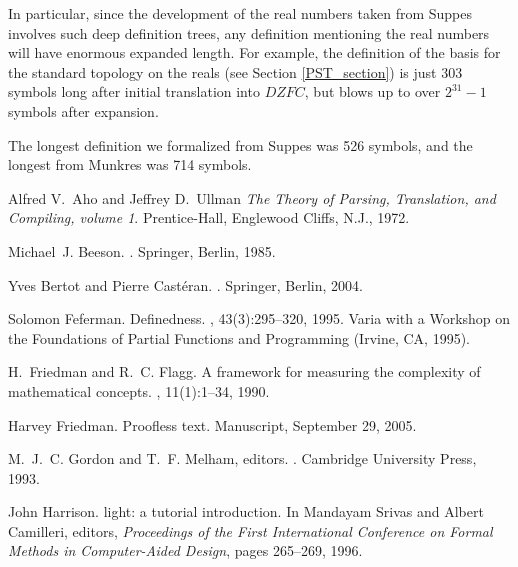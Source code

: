 \documentclass{llncs}
\newcommand{\na}[1]{\mathit{#1}}    \newcommand{\fn}[1]{\mathit{#1}}    \newcommand{\ax}[1]{\mathit{(#1)}}  \newcommand{\mdl}[1]{\mathcal{#1}}
\begin{document}
In particular, since the development of the real numbers taken from
Suppes \cite{suppes} involves such deep definition trees, any
definition mentioning the real numbers will have enormous expanded
length. For example, the definition of the basis for the standard
topology on the reals (see Section \ref{PST_section}) is just 303
symbols long after initial translation into $\na{DZFC}$, but blows up
to over $2^{31}-1$ symbols after expansion.

The longest definition we formalized from Suppes \cite{suppes} was 526
symbols, and the longest from Munkres \cite{munkres} was 714 symbols.



\begin{thebibliography}{10}

 Alfred V.~Aho and Jeffrey D.~Ullman \newblock
  {\em The Theory of Parsing, Translation, and Compiling, volume 1}.
  \newblock Prentice-Hall, Englewood Cliffs, N.J., 1972.

Michael~J. Beeson.
.
\newblock Springer, Berlin, 1985.

Yves Bertot and Pierre Cast\'eran.
.
\newblock Springer, Berlin, 2004.

Solomon Feferman.
\newblock Definedness.
, 43(3):295--320, 1995.
\newblock Varia with a Workshop on the Foundations of Partial Functions and
  Programming (Irvine, CA, 1995).

H.~Friedman and R.~C. Flagg.
\newblock A framework for measuring the complexity of mathematical concepts.
, 11(1):1--34, 1990.

Harvey Friedman.
\newblock Proofless text.
\newblock Manuscript, September 29, 2005.

M.~J.~C. Gordon and T.~F. Melham, editors.
.
\newblock Cambridge University Press, 1993.

John Harrison.
 light: a tutorial introduction.
\newblock In Mandayam Srivas and Albert Camilleri, editors, {\em Proceedings of
  the First International Conference on Formal Methods in Computer-Aided
  Design}, pages 265--269, 1996.


\end{thebibliography}
\end{document}
